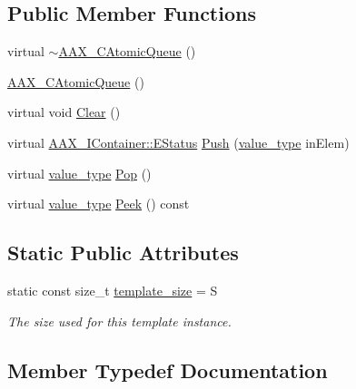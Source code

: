 \subsection*{Public Member Functions}
\begin{DoxyCompactItemize}
\item 
virtual \mbox{\hyperlink{a01441_a838ca2b3763f10c4e4d9e72b676fd358}{$\sim$\+A\+A\+X\+\_\+\+C\+Atomic\+Queue}} ()
\item 
\mbox{\hyperlink{a01441_ae048321b8d75f9fa073e6a24088d8260}{A\+A\+X\+\_\+\+C\+Atomic\+Queue}} ()
\item 
virtual void \mbox{\hyperlink{a01441_a9819ff531e285f2acd2c9fd2351617c4}{Clear}} ()
\item 
virtual \mbox{\hyperlink{a01785_aea020100f0b06636ce7cb25c2fdb0af7}{A\+A\+X\+\_\+\+I\+Container\+::\+E\+Status}} \mbox{\hyperlink{a01441_a2304d6ba1f1026b6a42de48056ab3050}{Push}} (\mbox{\hyperlink{a01441_acbb95bad3be34c7e4c770bc8c455c252}{value\+\_\+type}} in\+Elem)
\item 
virtual \mbox{\hyperlink{a01441_acbb95bad3be34c7e4c770bc8c455c252}{value\+\_\+type}} \mbox{\hyperlink{a01441_a0c64180813c16b4952761f82e32d7edd}{Pop}} ()
\item 
virtual \mbox{\hyperlink{a01441_acbb95bad3be34c7e4c770bc8c455c252}{value\+\_\+type}} \mbox{\hyperlink{a01441_a0b732544b0bcdd59acfca7fac5dca984}{Peek}} () const
\end{DoxyCompactItemize}
\subsection*{Static Public Attributes}
\begin{DoxyCompactItemize}
\item 
static const size\+\_\+t \mbox{\hyperlink{a01441_a7040410a6baeae48d153ef44ee0df1f1}{template\+\_\+size}} = S
\begin{DoxyCompactList}\small\item\em The size used for this template instance. \end{DoxyCompactList}\end{DoxyCompactItemize}


\subsection{Member Typedef Documentation}
\mbox{\label{a01441_aae36349d9419de62ce8e74b397749c27}} 
